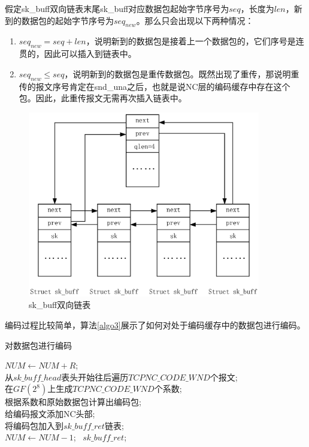 \par
假定sk\_buff双向链表末尾sk\_buff对应数据包起始字节序号为$seq$，长度为$len$，新到的数据包的起始字节序号为$seq_{new}$。那么只会出现以下两种情况：
\begin{enumerate}[fullwidth,itemindent=2em,label=(\arabic*)]
	\item $seq_{new}=seq+len$，说明新到的数据包是接着上一个数据包的，它们序号是连贯的，因此可以插入到链表中。
	\item $seq_{new} \le seq$，说明新到的数据包是重传数据包。既然出现了重传，那说明重传的报文序号肯定在snd\_una之后，也就是说NC层的编码缓存中存在这个包。因此，此重传报文无需再次插入链表中。
\end{enumerate}
\begin{figure}[htbp]
	\centering
	\includegraphics[width=4in]{figures/skbufflink.eps}
	\caption{sk\_buff双向链表}
	\label{SKBUFFLINK_EPS}
\end{figure}
\par
编码过程比较简单，算法\ref{algo3}展示了如何对处于编码缓存中的数据包进行编码。
\renewcommand{\algorithmcfname}{算法}
\begin{algorithm}
	\caption{对数据包进行编码} 
	
	\label{algo3}
	$NUM \leftarrow NUM+R$;\\
	{  
		从$sk\_buff\_head$表头开始往后遍历$TCPNC\_CODE\_WND$个报文;\\
		在$GF\left(2^8\right)$上生成$TCPNC\_CODE\_WND$个系数;\\
		根据系数和原始数据包计算出编码包;\\
		给编码报文添加NC头部;\\
		将编码包加入到$sk\_buff\_ret$链表;\\
		$NUM \leftarrow NUM-1$;
	}
	\Return \ $sk\_buff\_ret$;
\end{algorithm}






